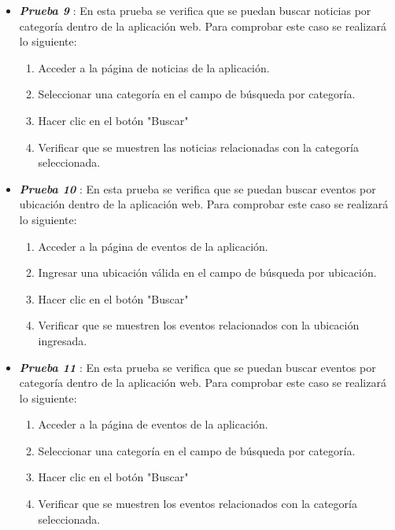 \begin{itemize}
   \item \textbf{\textit{Prueba 9}} \label{Prueba9}: En esta prueba se verifica que se puedan buscar noticias por categoría dentro de la aplicación web. Para comprobar este caso se realizará lo siguiente:

   \begin{enumerate}
       \item Acceder a la página de noticias de la aplicación.
       \item Seleccionar una categoría en el campo de búsqueda por categoría.
       \item Hacer clic en el botón "Buscar"
       \item  Verificar que se muestren las noticias relacionadas con la categoría seleccionada.
   \end{enumerate}


\item \textbf{\textit{Prueba 10}} \label{Prueba10}: En esta prueba se verifica que se puedan buscar eventos por ubicación dentro de la aplicación web. Para comprobar este caso se realizará lo siguiente:

   \begin{enumerate}
       \item Acceder a la página de eventos de la aplicación.
       \item Ingresar una ubicación válida en el campo de búsqueda por ubicación.
       \item Hacer clic en el botón "Buscar"
       \item  Verificar que se muestren los eventos relacionados con la ubicación ingresada.
   \end{enumerate}

   \item \textbf{\textit{Prueba 11}} \label{Prueba11}: En esta prueba se verifica que se puedan buscar eventos por categoría dentro de la aplicación web. Para comprobar este caso se realizará lo siguiente:

   \begin{enumerate}
       \item Acceder a la página de eventos de la aplicación.
       \item Seleccionar una categoría en el campo de búsqueda por categoría.
       \item Hacer clic en el botón "Buscar"
       \item  Verificar que se muestren los eventos relacionados con la categoría seleccionada.
   \end{enumerate}


\end{itemize}
